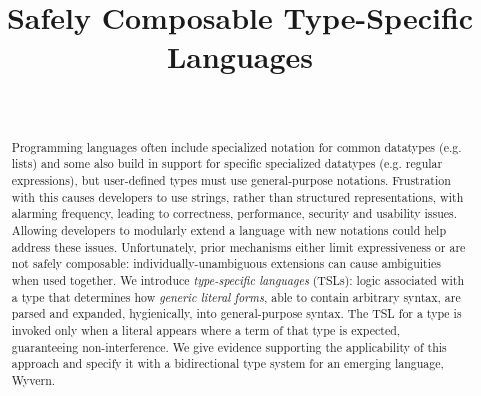 \documentclass[runningheads]{llncs}
\begin{document}
\title{Safely Composable Type-Specific Languages}
\author{~}
\institute{~}

\maketitle

\begin{abstract}
Programming languages often include specialized notation for common datatypes (e.g. lists) and some also build in support for specific specialized datatypes (e.g. regular expressions), but user-defined types must use general-purpose notations. Frustration with this causes developers to use strings, rather than structured representations, with alarming frequency, leading to correctness, performance, security and usability  issues.
Allowing developers to modularly extend a language with new notations could help address these issues. Unfortunately, prior mechanisms either limit expressiveness or are not safely composable: individually-unambiguous extensions can cause ambiguities when used together. We introduce \emph{type-specific languages} (TSLs):  logic associated with a type that determines how \emph{generic literal forms}, able to contain arbitrary syntax, are parsed and expanded, hygienically, into general-purpose syntax. The TSL for a type is invoked only when a literal appears where a term of that type is expected, guaranteeing non-interference. We give evidence supporting the applicability of  this approach and specify it with a bidirectional type system for an emerging language, Wyvern.


\end{abstract}
\end{document}

